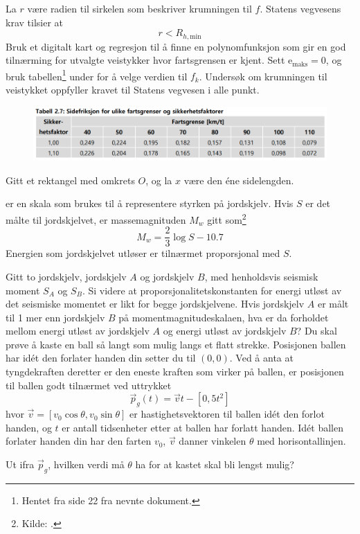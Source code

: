 La $ r $ være radien til sirkelen som beskriver krumningen til $ f $. Statens vegvesens krav tilsier at 
\[ r< R_{h, \text{min}} \]
Bruk et digitalt kart og regresjon til å finne en polynomfunksjon som gir en god tilnærming for utvalgte veistykker hvor fartsgrensen er kjent. Sett $ \textrm{e}_\text{maks}=0 $, og bruk tabellen\footnote{Hentet fra side 22 fra nevnte dokument.} under for å velge verdien til $ f_k $. Undersøk om krumningen til veistykket oppfyller kravet til Statens vegvesen i alle punkt.
\begin{figure}
	\includegraphics[scale=0.32]{fig/tab2_7}
\end{figure}
\newpage
{} 
Gitt et rektangel med omkrets $ O $, og la $ x $ være den éne sidelengden.

 er en skala som brukes til å representere styrken på jordskjelv. Hvis $ S $ er det målte  til jordskjelvet, er massemagnituden $ M_w $ gitt som\footnote{Kilde: .}
\[ M_w=\frac{2}{3} \log S-10.7 \]
Energien som jordskjelvet utløser er tilnærmet proporsjonal med $ S $.\os

Gitt to jordskjelv, jordskjelv $ A $ og jordskjelv $ B $, med henholdsvis seismisk moment $ S_A $ og $ S_B $. Si videre at proporsjonalitetskonstanten for energi utløst av det seismiske momentet er likt for begge jordskjelvene. Hvis jordskjelv $ A $ er målt til 1 mer enn jordskjelv $ B $ på momentmagnitudeskalaen, hva er da forholdet mellom energi utløst av jordskjelv $ A $ og energi utløst av jordskjelv $ B $? 
\newpage
{}
Du skal prøve å kaste en ball så langt som mulig langs et flatt strekke. Posisjonen ballen har idét den forlater handen din setter du til $ (0, 0) $. Ved å anta at tyngdekraften deretter er den eneste kraften som virker på ballen, er posisjonen til ballen godt tilnærmet ved uttrykket
\[ \vec{p}_g(t)=\vec{v}t-[0, 5t^2] \]
hvor $ \vec{v}=[v_0 \cos \theta, v_0 \sin \theta] $ er hastighetsvektoren til ballen idét den forlot handen, og $ t $ er antall tidsenheter etter at ballen har forlatt handen. Idét ballen forlater handen din har den farten $ v_0 $, $ \vec{v} $ danner vinkelen $ \theta $ med horisontallinjen.\vsk 

Ut ifra $ \vec{p}_g $, hvilken verdi må $ \theta $ ha for at kastet skal bli lengst mulig?



